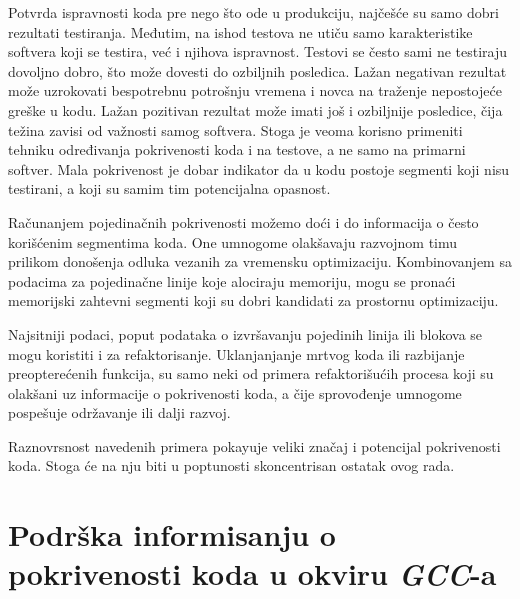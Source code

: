 \documentclass[12pt,oneside]{memoir}
\newcommand{\strano}[1]{\textit{#1}}
\begin{document}
Potvrda ispravnosti koda pre nego što ode u produkciju, najčešće su samo dobri rezultati testiranja. Međutim, na ishod testova ne utiču samo karakteristike softvera koji se testira, već i njihova ispravnost. Testovi se često sami ne testiraju dovoljno dobro, što može dovesti do ozbiljnih posledica. Lažan negativan rezultat može uzrokovati bespotrebnu potrošnju vremena i novca na traženje nepostojeće greške u kodu. Lažan pozitivan rezultat može imati još i ozbiljnije posledice, čija težina zavisi od važnosti samog softvera. Stoga je veoma korisno primeniti tehniku određivanja pokrivenosti koda i na testove, a ne samo na primarni softver. Mala pokrivenost je dobar indikator da u kodu postoje segmenti koji nisu testirani, a koji su samim tim potencijalna opasnost. 

Računanjem pojedinačnih pokrivenosti možemo doći i do informacija o često korišćenim segmentima koda. One umnogome olakšavaju razvojnom timu prilikom donošenja odluka vezanih za vremensku optimizaciju. Kombinovanjem sa podacima za pojedinačne linije koje alociraju memoriju, mogu se pronaći memorijski zahtevni segmenti koji su dobri kandidati za prostornu optimizaciju.

Najsitniji podaci, poput podataka o izvršavanju pojedinih linija ili blokova se mogu koristiti i za refaktorisanje. Uklanjanjanje mrtvog koda ili razbijanje preopterećenih funkcija, su samo neki od primera refaktorišućih procesa koji su olakšani uz informacije o pokrivenosti koda, a čije sprovođenje umnogome pospešuje održavanje ili dalji razvoj.

Raznovrsnost navedenih primera pokayuje veliki značaj i potencijal pokrivenosti koda. Stoga će na nju biti u poptunosti skoncentrisan ostatak ovog rada. 


\chapter{Podrška informisanju o pokrivenosti koda u okviru \strano{GCC}-a}
\label{chp:ideja}
\end{document}
